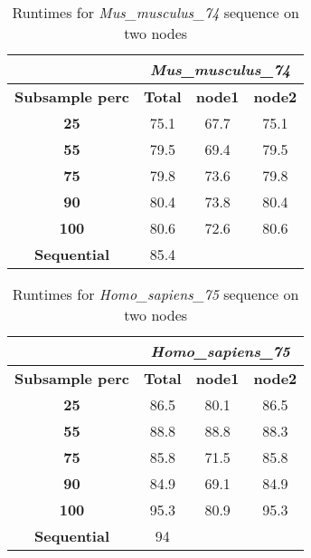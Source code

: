 \documentclass{acm_proc_article-sp}
\begin{document}
\begin{table}[h]
\begin{tabular}{c|c|c|c|}
\cline{2-4}
 & \multicolumn{3}{c|}{\textit{\textbf{Mus\_musculus\_74}}} \\ \hline
\multicolumn{1}{|c|}{\textbf{Subsample perc}} & \textbf{Total} & \textbf{node1} & \textbf{node2} \\ \hline
\multicolumn{1}{|c|}{\textbf{25}} & 75.1 & 67.7 & 75.1 \\ \hline
\multicolumn{1}{|c|}{\textbf{55}} & 79.5 & 69.4 & 79.5 \\ \hline
\multicolumn{1}{|c|}{\textbf{75}} & 79.8 & 73.6 & 79.8 \\ \hline
\multicolumn{1}{|c|}{\textbf{90}} & 80.4 & 73.8 & 80.4 \\ \hline
\multicolumn{1}{|c|}{\textbf{100}} & 80.6 & 72.6 & 80.6 \\ \hline
\multicolumn{1}{|c|}{\textbf{Sequential}} & 85.4 & \multicolumn{1}{l|}{} & \multicolumn{1}{l|}{} \\ \hline
\end{tabular}
\caption{Runtimes for \textit{Mus\_musculus\_74} sequence on two nodes}
\end{table}

\begin{table}[h]
\begin{tabular}{c|c|c|c|}
\cline{2-4}
\textbf{} & \multicolumn{3}{c|}{\textit{\textbf{Homo\_sapiens\_75}}} \\ \hline
\multicolumn{1}{|c|}{\textbf{Subsample perc}} & \textbf{Total} & \textbf{node1} & \textbf{node2} \\ \hline
\multicolumn{1}{|c|}{\textbf{25}} & 86.5 & 80.1 & 86.5 \\ \hline
\multicolumn{1}{|c|}{\textbf{55}} & 88.8 & 88.8 & 88.3 \\ \hline
\multicolumn{1}{|c|}{\textbf{75}} & 85.8 & 71.5 & 85.8 \\ \hline
\multicolumn{1}{|c|}{\textbf{90}} & 84.9 & 69.1 & 84.9 \\ \hline
\multicolumn{1}{|c|}{\textbf{100}} & 95.3 & 80.9 & 95.3 \\ \hline
\multicolumn{1}{|c|}{\textbf{Sequential}} & 94 & \multicolumn{1}{l|}{} & \multicolumn{1}{l|}{} \\ \hline
\end{tabular}
\caption{Runtimes for \textit{Homo\_sapiens\_75} sequence on two nodes}
\end{table}
\end{document}
